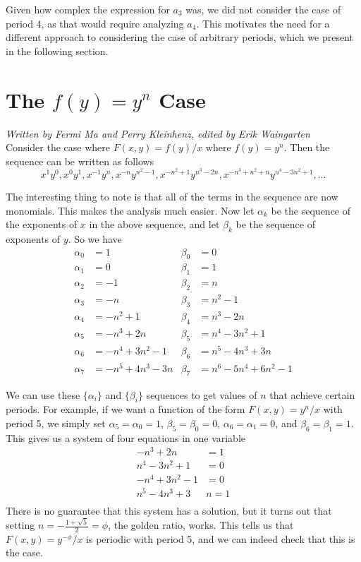 \documentclass[12pt]{article}
\begin{document}
Given how complex the expression for $a_3$ was, we did not consider the case of period 4, as that would require analyzing $a_4$. This motivates the need for a different approach to considering the case of arbitrary periods, which we present in the following section.

\section{The $f(y) = y^n$ Case}
\label{general case}

\emph{Written by Fermi Ma and Perry Kleinhenz, edited by Erik Waingarten}\\

Consider the case where $F(x,y) = f(y)/x$ where $f(y) = y^n$. Then the sequence can be written as follows
\[ x^1y^0, x^0y^1, x^{-1}y^{n}, x^{-n}y^{n^2-1}, x^{-n^2+1}y^{n^3-2n},x^{-n^3+n^2+n}y^{n^4-3n^2+1}, \dots \]

The interesting thing to note is that all of the terms in the sequence are now monomials. This makes the analysis much easier. Now let $\alpha_k$ be the sequence of the exponents of $x$ in the above sequence, and let $\beta_k$ be the sequence of exponents of $y$. So we have
\begin{align*}
\alpha_0 &= 1  &\beta_0& = 0\\
\alpha_1 &= 0 &\beta_1& = 1\\
\alpha_2 &= -1  &\beta_2& = n\\
\alpha_3 &= -n &\beta_3& = n^2-1\\
\alpha_4 &= -n^2+1 &\beta_4& = n^3-2n\\
\alpha_5 &= -n^3+2n &\beta_5& =n^4-3n^2+1\\ 
\alpha_6 &= -n^4+3n^2 -1 &\beta_6& =n^5-4n^3+3n \\ 
\alpha_7 &= -n^5+4n^3 - 3n &\beta_7& =n^6-5n^4+6n^2 - 1
\end{align*}

We can use these $\{\alpha_i\}$ and $\{\beta_i\}$ sequences to get values of $n$ that achieve certain periods. For example, if we want a function of the form $F(x,y) = y^n/x$ with period 5, we simply set $\alpha_5 = \alpha_0 = 1$, $\beta_5 = \beta_0 = 0$, $\alpha_6 = \alpha_1 = 0$, and $\beta_6 = \beta_1 = 1$. This gives us a system of four equations in one variable
\begin{align*}
-n^3+2n &= 1\\
n^4-3n^2+1&=0\\
-n^4+3n^2 -1&= 0\\
n^5-4n^3+3&n=1\\
\end{align*}
There is no guarantee that this system has a solution, but it turns out that setting $n = -\frac{1+\sqrt{5}}{2} = \phi$, the golden ratio, works. This tells us that $F(x,y) = y^{-\phi}/x$ is periodic with period 5, and we can indeed check that this is the case.
\end{document}
